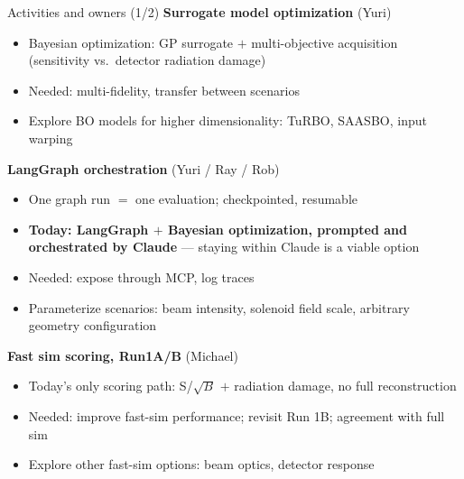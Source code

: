 \documentclass[aspectratio=169,10pt]{beamer}
\begin{document}
\begin{frame}{Activities and owners (1/2)}
\small
\textbf{Surrogate model optimization} \hfill \textcolor{fnalblue}{(Yuri)}
\begin{itemize}\small
  \item Bayesian optimization: GP surrogate $+$ multi-objective acquisition (sensitivity vs.\ detector radiation damage)
  \item Needed: multi-fidelity, transfer between scenarios
  \item Explore BO models for higher dimensionality: TuRBO, SAASBO, input warping
\end{itemize}
\vspace{0.8em}

\textbf{LangGraph orchestration} \hfill \textcolor{fnalblue}{(Yuri / Ray / Rob)}
\begin{itemize}\small
  \item One graph run $=$ one evaluation; checkpointed, resumable
  \item \textbf{Today: LangGraph $+$ Bayesian optimization, prompted and orchestrated by Claude} --- staying within Claude is a viable option
  \item Needed: expose through MCP, log traces
  \item Parameterize scenarios: beam intensity, solenoid field scale, arbitrary geometry configuration
\end{itemize}
\vspace{0.8em}

\textbf{Fast sim scoring, Run1A/B} \hfill \textcolor{fnalblue}{(Michael)}
\begin{itemize}\small
  \item Today's only scoring path: S/$\sqrt{B}$ $+$ radiation damage, no full reconstruction
  \item Needed: improve fast-sim performance; revisit Run 1B; agreement with full sim
  \item Explore other fast-sim options: beam optics, detector response
\end{itemize}
\end{frame}
\end{document}

